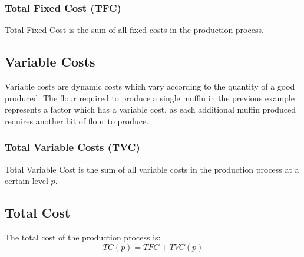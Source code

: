 \documentclass[letterpaper, 12pt]{article}
\begin{document}
\subsubsection{Total Fixed Cost (TFC)}
Total Fixed Cost is the sum of all fixed costs in the production process.

\subsection{Variable Costs}
Variable costs are dynamic costs which vary according to the quantity of a
good produced. The flour required to produce a single muffin in the previous
example represents a factor which has a variable cost, as each additional
muffin produced requires another bit of flour to produce.

\subsubsection{Total Variable Costs (TVC)}
Total Variable Cost is the sum of all variable costs in the production process
at a certain level \( p \).

\subsection{Total Cost}
The total cost of the production process is:
\[ TC(p) = TFC+TVC(p) \]
\end{document}
